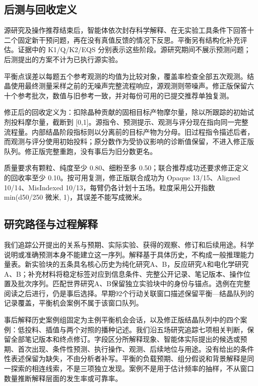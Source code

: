 \documentclass[10pt,a4paper]{article}
\begin{document}
\subsection{后测与回收定义}\label{ux540eux6d4bux4e0eux56deux6536ux5b9aux4e49}

源研究及操作推荐结束后，智能体依次封存科学解释、在无实验工具条件下回答十二个固定新干预问题，再在没有真值反馈的情况下反思。平衡另有结构化补充评估。证据中的 K1/Q/K2/EQS 分别表示这些阶段。源研究期间不展示预测问题；后测提出的方案不计为已执行源实验。

平衡点误差以每题五个参考观测的均值为比较对象，覆盖率检查全部五次观测。结晶使用最终测量采样之前的无噪声完整流程响应，源观测则带噪声。修正版保留六十个参考批次，数值与旧参考一致，并对每份可用的已提交推荐单独复测。

修正后的回收定义为：扣除晶种贡献的固相目标产物摩尔量，除以所跟踪的初始试剂投料摩尔量，截断到 {[}0,1{]}。源指令、预测提示、观测与评分现在指向同一完整流程量。内部结晶阶段指标则以分离前的目标产物为分母。旧过程指令描述后者，而观测与评分使用初始投料；原分数作为受协议影响的诊断值保留，不进入修正版队列。修正版完整重跑，没有事后为旧分数更名。

质量要求有颗粒、纯度至少 0.80、细粉至多 0.50；联合推荐成功还要求修正定义的回收率至少 0.10。按可用复测，修正版联合成功为 Opaque 13/15、Aligned 10/14、MisIndexed 10/13，每臂仍各计划十五场。粒度采用公开指数 min(d50/250 微米, 1)，其误差不能写成微米。

\subsection{研究路径与过程解释}\label{ux7814ux7a76ux8defux5f84ux4e0eux8fc7ux7a0bux89e3ux91ca}

我们追踪公开提出的关系与预期、实际实验、获得的观察、修订和后续用途。科学说明或准确预测本身不能建立这一序列。解释基于具体历史，不构成一般推理能力量表。新实验块的五条具名核心历史为纯化研究A、B，反应研究A和电化学研究A、B；补充材料将稳定标签对应到信息条件、完整公开记录、笔记版本、操作位置及批次序列。匹配世界研究A、B保留独立实验块中的身份与锚点。选例在完整阅读之后进行，仍是事后选择。早期92个行动关联窗口描述保留平衡---结晶队列的记录覆盖，平衡机会案例不属于该窗口队列。

事后解释历史案例组固定为主例平衡机会会话，以及修正版结晶队列中的四个案例：低投料、插值与两个对照的播种记述。我们沿五场研究追踪七项相关判断，保留全部笔记版本和终点修订。字段区分所解释现象、智能体实际提出的候选或预期、首次出现、条件性预测、执行操作、观测、后续地位与用途。没有给出的条件性表述保留为缺失，不由分析者补写。平衡的负载预期、组分假说和背景解释是同一探索的相连线索，不是三项独立发现。案例不是用于估计频率的抽样，不从窗口数量推断解释层面的发生率或可靠率。
\end{document}
